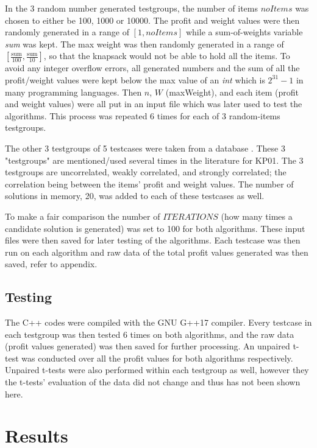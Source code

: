 \documentclass[titlepage]{article}
\begin{document}
In the 3 random number generated testgroups, the number of items $noItems$ was chosen to either be 100, 1000 or 10000. The profit and weight values were then randomly generated in a range of $ [1, noItems] $ while a sum-of-weights variable \emph{sum} was kept. The max weight was then randomly generated in a range of $[\frac{\text{sum}}{100} , \frac{\text{sum}}{10}]$, so that the knapsack would not be able to hold all the items. To avoid any integer overflow errors, all generated numbers and the sum of all the profit/weight values were kept below the max value of an \emph{int} which is $2^{31}-1$ in many programming languages.  Then $n$, $W$ (maxWeight), and each item (profit and weight values) were all put in an input file which was later used to test the algorithms. This process was repeated 6 times for each of 3 random-items testgroups.

The other 3 testgroups of 5 testcases were taken from a database \cite{dataset}. These 3 "testgroups" are mentioned/used several times in the literature for KP01. The 3 testgroups are uncorrelated, weakly correlated, and strongly correlated; the correlation being between the items' profit and weight values. The number of solutions in memory, 20, was added to each of these testcases as well. 

To make a fair comparison the number of $ITERATIONS$ (how many times a candidate solution is generated) was set to 100 for both algorithms. These input files were then saved for later testing of the algorithms. Each testcase was then run on each algorithm and raw data of the total profit values generated was then saved, refer to appendix.

\subsection{Testing}
The C++ codes were compiled with the GNU G++17 compiler. Every testcase in each testgroup was then tested 6 times on both algorithms, and the raw data (profit values generated) was then saved for further processing. An unpaired t-test was conducted over all the profit values for both algorithms respectively. Unpaired t-tests were also performed within each testgroup as well, however they the t-tests' evaluation of the data did not change and thus has not been shown here. 

\newpage

\section{Results}
\end{document}

